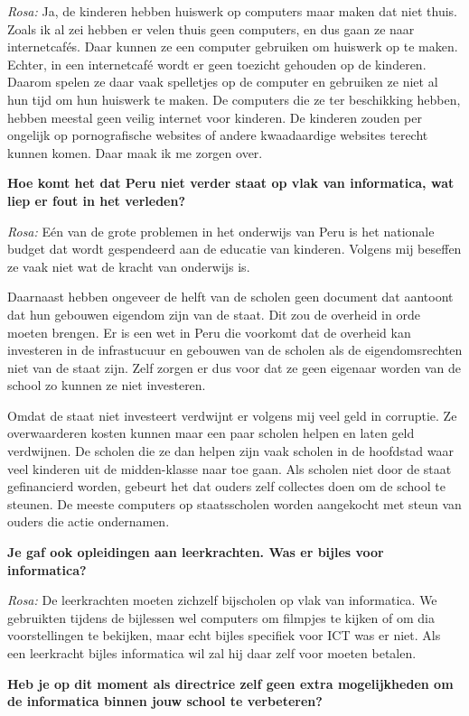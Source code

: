 \textit{Rosa:} Ja, de kinderen hebben huiswerk op computers maar maken dat niet thuis. Zoals ik al zei hebben er velen thuis geen computers, en dus gaan ze naar internetcafés. Daar kunnen ze een computer gebruiken om huiswerk op te maken. Echter, in een internetcafé wordt er geen toezicht gehouden op de kinderen. Daarom spelen ze daar vaak spelletjes op de computer en gebruiken ze niet al hun tijd om hun huiswerk te maken. De computers die ze ter beschikking hebben, hebben meestal geen veilig internet voor kinderen. De kinderen zouden per ongelijk op pornografische websites of andere kwaadaardige websites terecht kunnen komen. Daar maak ik me zorgen over.

\textbf{Hoe komt het dat Peru niet verder staat op vlak van informatica, wat liep er fout in het verleden?}

\textit{Rosa:} Eén van de grote problemen in het onderwijs van Peru is het nationale budget dat wordt gespendeerd aan de educatie van kinderen. Volgens mij beseffen ze vaak niet wat de kracht van onderwijs is. 

Daarnaast hebben ongeveer de helft van de scholen geen document dat aantoont dat hun gebouwen eigendom zijn van de staat. Dit zou de overheid in orde moeten brengen. Er is een wet in Peru die voorkomt dat de overheid kan investeren in de infrastucuur en gebouwen van de scholen als de eigendomsrechten niet van de staat zijn. Zelf zorgen er dus voor dat ze geen eigenaar worden van de school zo kunnen ze niet investeren.

Omdat de staat niet investeert verdwijnt er volgens mij veel geld in corruptie. Ze overwaarderen kosten kunnen maar een paar scholen helpen en laten geld verdwijnen. De scholen die ze dan helpen zijn vaak scholen in de hoofdstad waar veel kinderen uit de midden-klasse naar toe gaan. Als scholen niet door de staat gefinancierd worden, gebeurt het dat ouders zelf collectes doen om de school te steunen. De meeste computers op staatsscholen worden aangekocht met steun van ouders die actie ondernamen. 

\textbf{Je gaf ook opleidingen aan leerkrachten. Was er bijles voor informatica?}

\textit{Rosa:} De leerkrachten moeten zichzelf bijscholen op vlak van informatica. We gebruikten tijdens de bijlessen wel computers om filmpjes te kijken of om dia voorstellingen te bekijken, maar echt bijles specifiek voor ICT was er niet. Als een leerkracht bijles informatica wil zal hij daar zelf voor moeten betalen.

\textbf{Heb je op dit moment als directrice zelf geen extra mogelijkheden om de informatica binnen jouw school te verbeteren?}

